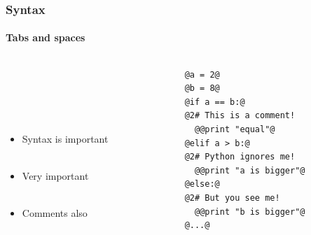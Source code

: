 \documentclass[handout]{beamer}
\begin{document}
\begin{frame}[fragile]
\frametitle{Syntax}
\framesubtitle{Tabs and spaces}
\large
  \begin{columns}[T]
    \begin{column}{.5\textwidth} 
\ \\ 

\ \\ 

\ \\ 
\ \\

\begin{itemize}


\item Syntax is important \ \\
\ \\ 
\item Very important \ \\
\ \\
\item<2-> Comments also



\end{itemize}
     \end{column}
     
         \begin{column}{.5\textwidth} 
\begin{lstlisting}[style=base]
@a = 2@
@b = 8@
@if a == b:@
@2# This is a comment!
  @@print "equal"@
@elif a > b:@
@2# Python ignores me!
  @@print "a is bigger"@
@else:@
@2# But you see me!
  @@print "b is bigger"@
@...@
\end{lstlisting}

    \end{column}
    \end{columns}

\end{frame}
\end{document}
